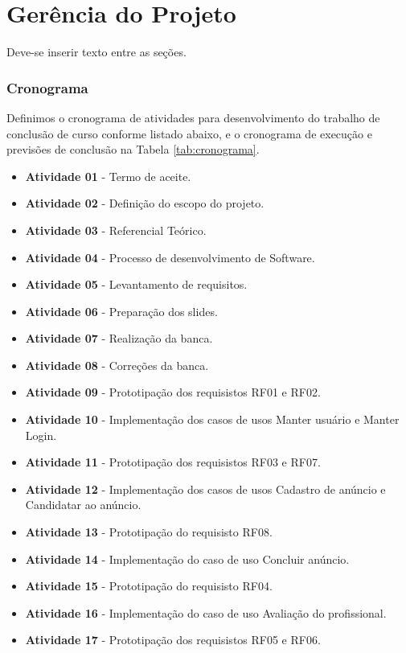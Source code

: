 \chapter{Gerência do Projeto}\label{cap:desenvolvimento}
Deve-se inserir texto entre as seções.
\subsection{Cronograma}

Definimos o cronograma de atividades para desenvolvimento do trabalho de conclusão de curso conforme listado abaixo, e o cronograma de execução e previsões de conclusão na Tabela \ref{tab:cronograma}.

\begin{itemize}
    \item \textbf{Atividade 01} - Termo de aceite.
    \item \textbf{Atividade 02} - Definição do escopo do projeto.
    \item \textbf{Atividade 03} - Referencial Teórico.
    \item \textbf{Atividade 04} - Processo de desenvolvimento de Software.
    \item \textbf{Atividade 05} - Levantamento de requisitos.
    \item \textbf{Atividade 06} - Preparação dos slides.
    \item \textbf{Atividade 07} - Realização da banca.
    \item \textbf{Atividade 08} - Correções da banca.
    \item \textbf{Atividade 09} - Prototipação dos requisistos RF01 e RF02.
    \item \textbf{Atividade 10} - Implementação dos casos de usos Manter usuário e Manter Login.
    \item \textbf{Atividade 11} - Prototipação dos requisistos RF03 e RF07.
    \item \textbf{Atividade 12} - Implementação dos casos de usos Cadastro de anúncio e Candidatar ao anúncio.
    \item \textbf{Atividade 13} - Prototipação do requisisto RF08.
    \item \textbf{Atividade 14} - Implementação do caso de uso Concluir anúncio.
    \item \textbf{Atividade 15} - Prototipação do requisisto RF04.
    \item \textbf{Atividade 16} - Implementação do caso de uso Avaliação do profissional.
    \item \textbf{Atividade 17} - Prototipação dos requisistos RF05 e RF06.
\end{itemize}

